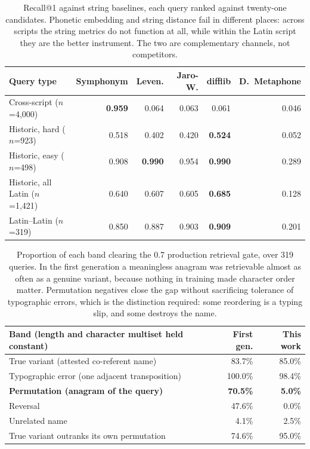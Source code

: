 \documentclass[11pt,a4paper]{article}
\begin{document}
\clearpage

\begin{table}[p]
\centering
\small
\begin{tabular}{lrrrrr}
\toprule
\textbf{Query type} & \textbf{Symphonym} & \textbf{Leven.} & \textbf{Jaro-W.} & \textbf{difflib} & \textbf{D.\ Metaphone} \\
\midrule
Cross-script ($n$=4,000)      & \textbf{0.959} & 0.064 & 0.063 & 0.061 & 0.046 \\
Historic, hard ($n$=923)      & 0.518 & 0.402 & 0.420 & \textbf{0.524} & 0.052 \\
Historic, easy ($n$=498)      & 0.908 & \textbf{0.990} & 0.954 & \textbf{0.990} & 0.289 \\
Historic, all Latin ($n$=1,421) & 0.640 & 0.607 & 0.605 & \textbf{0.685} & 0.128 \\
Latin--Latin ($n$=319)        & 0.850 & 0.887 & 0.903 & \textbf{0.909} & 0.201 \\
\bottomrule
\end{tabular}
\caption{Recall@1 against string baselines, each query ranked against twenty-one candidates. Phonetic embedding and string distance fail in different places: across scripts the string metrics do not function at all, while within the Latin script they are the better instrument. The two are complementary channels, not competitors.}
\label{tab:vstraditional}
\end{table}

\clearpage

\begin{table}[p]
\centering
\small
\begin{tabular}{lrr}
\toprule
\textbf{Band (length and character multiset held constant)} & \textbf{First gen.} & \textbf{This work} \\
\midrule
True variant (attested co-referent name)      & 83.7\% & 85.0\% \\
Typographic error (one adjacent transposition) & 100.0\% & 98.4\% \\
\textbf{Permutation (anagram of the query)}   & \textbf{70.5\%} & \textbf{5.0\%} \\
Reversal                                      & 47.6\% & 0.0\% \\
Unrelated name                                & 4.1\% & 2.5\% \\
\midrule
True variant outranks its own permutation     & 74.6\% & 95.0\% \\
\bottomrule
\end{tabular}
\caption{Proportion of each band clearing the 0.7 production retrieval gate, over 319 queries. In the first generation a meaningless anagram was retrievable almost as often as a genuine variant, because nothing in training made character order matter. Permutation negatives close the gap without sacrificing tolerance of typographic errors, which is the distinction required: some reordering is a typing slip, and some destroys the name.}
\label{tab:order}
\end{table}
\end{document}
